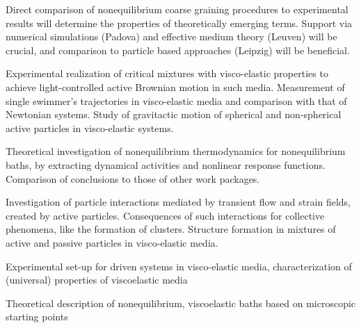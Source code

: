 \begin{workpackage}
\begin{tasklist}
\begin{task}[title=Theoretical identification of nonequilibrium signatures of the bath,id=brown-t3,PM=24,lead=USTUTT,wphases=0-24!1.0,partners={KUL,UNIPD,ULEI}]
Direct comparison of nonequilibrium coarse graining procedures to experimental results will
determine the properties of theoretically emerging terms. Support via numerical simulations
(Padova) and effective medium theory (Leuven) will be crucial, and comparison to particle
based approaches (Leipzig) will be beneficial.
\end{task}

\begin{task}[title=Self-propelled particles in visco-elastic baths,id=brown-t4,PM=24,lead=USTUTT,wphases=24-48!0.5]
Experimental realization of critical mixtures with visco-elastic properties to achieve light-controlled active Brownian motion in such media. Measurement of single swimmer's trajectories in visco-elastic media and comparison with that of Newtonian systems. Study of gravitactic motion of spherical and non-spherical active particles in visco-elastic systems. 
\end{task}
\begin{task}[title=Nonequilbrium thermodynamics,id=brown-t5,PM=24,lead=USTUTT,wphases=24-48!1.0,partners={KUL,UNIPD,ULEI}]
Theoretical investigation of nonequilibrium thermodynamics for nonequilibrium baths, by
extracting dynamical activities and nonlinear response functions. Comparison of conclusions
to those of other work packages.
\end{task}

\begin{task}[title=Collective behavior of self-propelled particles in visco-elastic baths,id=brown-t6,PM=24,lead=USTUTT,wphases=24-48!0.5]
Investigation of particle interactions mediated by transient flow and strain fields, created by active particles. Consequences of such interactions for collective phenomena, like the formation of clusters. Structure formation in mixtures of active and passive particles in visco-elastic media.  
\end{task}


\end{tasklist}

\begin{wpdelivs}
  \begin{wpdeliv}[due=24,id=brown-d1,dissem=PU,nature=DEM,lead=USTUTT,miles=data1]
      {Experimental set-up for driven systems in visco-elastic media, characterization of (universal) properties of viscoelastic media}
  \end{wpdeliv}
  \begin{wpdeliv}[due=24,id=brown-d2,dissem=PU,nature=DEM,lead=USTUTT,miles=data1]
      {Theoretical description of nonequilibrium, viscoelastic baths based on microscopic starting points}
\end{wpdeliv}
 

\end{wpdelivs}
\end{workpackage}

